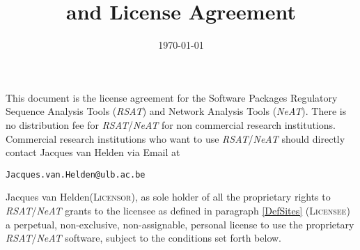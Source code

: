 \documentclass[12pt]{article}
\title{\RSAT and \NeAT License Agreement}
\author{\vspace*{-1cm}}
\date{\vspace*{-1cm}\today}
\makeatletter
\newcommand{\RSAT}[0]{\emph{RSAT}\xspace}
\newcommand{\NeAT}[0]{\emph{NeAT}\xspace}
\newcommand{\Licensorname}[0]{Jacques van Helden\xspace}
\newcommand{\Licensor}[0]{\textsc{Licensor}\xspace}
\newcommand{\Licensee}[0]{\textsc{Licensee}\xspace}
\newcommand{\JvHemail}[0]{\texttt{\small Jacques.van.Helden@ulb.ac.be}\xspace}
\makeatother
\begin{document}
\maketitle

This document is the license agreement for the Software Packages
Regulatory Sequence Analysis Tools (\RSAT) and Network Analysis Tools
(\NeAT).  There is no distribution fee for \RSAT/\NeAT for non commercial
research institutions. Commercial research institutions who want to
use \RSAT/\NeAT should directly contact Jacques van Helden via Email at
\begin{center}
\JvHemail
\end{center}

\Licensorname (\Licensor), as sole holder of all the proprietary
rights to \RSAT/\NeAT grants to the licensee as defined in paragraph
\ref{DefSites} (\Licensee) a perpetual, non-exclusive, non-assignable,
personal license to use the proprietary \RSAT/\NeAT software, subject to the
conditions set forth below.
\end{document}
